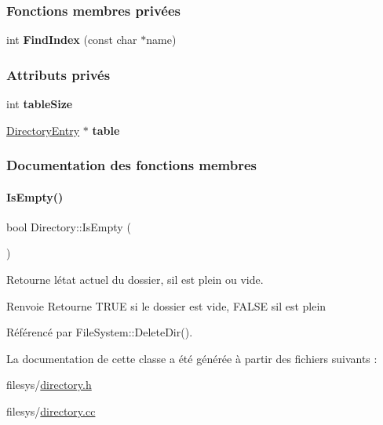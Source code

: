 \subsubsection*{Fonctions membres privées}
\begin{DoxyCompactItemize}
\item 
\hypertarget{class_directory_ac7f09c7b36c1d0cf68d36ae0e922e6d9}{}\label{class_directory_ac7f09c7b36c1d0cf68d36ae0e922e6d9} 
int {\bfseries Find\+Index} (const char $\ast$name)
\end{DoxyCompactItemize}
\subsubsection*{Attributs privés}
\begin{DoxyCompactItemize}
\item 
\hypertarget{class_directory_a3d30c557f3616574ff9eaeeb4163b82d}{}\label{class_directory_a3d30c557f3616574ff9eaeeb4163b82d} 
int {\bfseries table\+Size}
\item 
\hypertarget{class_directory_a58597cdbf161409c3469527f2169894b}{}\label{class_directory_a58597cdbf161409c3469527f2169894b} 
\hyperlink{class_directory_entry}{Directory\+Entry} $\ast$ {\bfseries table}
\end{DoxyCompactItemize}


\subsubsection{Documentation des fonctions membres}
\hypertarget{class_directory_a2f4299d8d962c0384f707274d7563932}{}\label{class_directory_a2f4299d8d962c0384f707274d7563932} 
\paragraph{\texorpdfstring{Is\+Empty()}{IsEmpty()}}
{\footnotesize\ttfamily bool Directory\+::\+Is\+Empty (\begin{DoxyParamCaption}{ }\end{DoxyParamCaption})}



Retourne l\textquotesingle{}état actuel du dossier, s\textquotesingle{}il est plein ou vide. 

\begin{DoxyReturn}{Renvoie}
Retourne T\+R\+UE si le dossier est vide, F\+A\+L\+SE s\textquotesingle{}il est plein 
\end{DoxyReturn}


Référencé par File\+System\+::\+Delete\+Dir().



La documentation de cette classe a été générée à partir des fichiers suivants \+:\begin{DoxyCompactItemize}
\item 
filesys/\hyperlink{directory_8h}{directory.\+h}\item 
filesys/\hyperlink{directory_8cc}{directory.\+cc}\end{DoxyCompactItemize}
